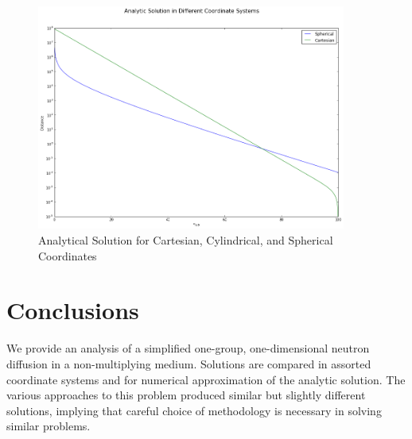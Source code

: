 \documentclass[10pt,peerreviewca]{IEEEtran} %
\begin{document}
	\begin{figure}
		\begin{centering}
		\includegraphics[width=4in]{different_coordinate_systems}
		\caption{Analytical Solution for Cartesian, Cylindrical, and Spherical Coordinates}
		\label{fig:different coordinate systems}
		\end{centering}
	\end{figure}
	
	\section{Conclusions}
	We provide an analysis of a simplified one-group, one-dimensional neutron diffusion in a non-multiplying medium. Solutions are compared in assorted coordinate systems and for numerical approximation of the analytic solution. The various approaches to this problem produced similar but slightly different solutions, implying that careful choice of methodology is necessary in solving similar problems. 
\end{document}
